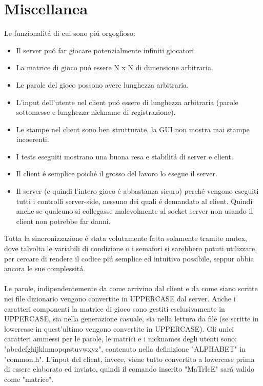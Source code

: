 \chapter{Miscellanea}

Le funzionalit\'a di cui sono pi\'u orgoglioso:
\begin{itemize}
\item Il server pu\'o far giocare potenzialmente infiniti giocatori.
\item La matrice di gioco pu\'o essere N x N di dimensione arbitraria.
\item Le parole del gioco possono avere lunghezza arbitraria.
\item L'input dell'utente nel client pu\'o essere di lunghezza arbitraria (parole sottomesse e lunghezza nickname di registrazione).
\item Le stampe nel client sono ben strutturate, la GUI non mostra mai stampe incoerenti.
\item I tests eseguiti mostrano una buona resa e stabilit\'a di server e client.
\item Il client \'e semplice poich\'e il grosso del lavoro lo esegue il server.
\item Il server (e quindi l'intero gioco \'e abbastanza sicuro) perch\'e vengono eseguiti tutti i controlli server-side, nessuno dei quali \'e demandato al client. Quindi anche se qualcuno si collegasse malevolmente al socket server non usando il client non potrebbe far danni.
\end{itemize}
\leavevmode 
Tutta la sincronizzazione \'e stata volutamente fatta solamente tramite mutex, dove talvolta le variabili di condizione o i semafori si sarebbero potuti utilizzare, per cercare di rendere il codice pi\'u semplice ed intuitivo possibile, seppur abbia ancora le sue complessit\'a.
\\
 \\
 Le parole, indipendentemente da come arrivino dal client e da come siano scritte nei file dizionario vengono convertite in UPPERCASE dal server. Anche i caratteri componenti la matrice di gioco sono gestiti esclusivamente in UPPERCASE, sia nella generazione casuale, sia nella lettura da file (se scritte in lowercase in quest'ultimo vengono convertite in UPPERCASE). Gli unici caratteri ammessi per le parole, le matrici e i nicknames degli utenti sono: "abcdefghijklmnopqrstuvwxyz", contenuto nella definizione "ALPHABET" in "common.h". L'input del client, invece, viene tutto convertito a lowercase prima di essere elaborato ed inviato, quindi il comando inserito "MaTrIcE" sar\'a valido come "matrice".

